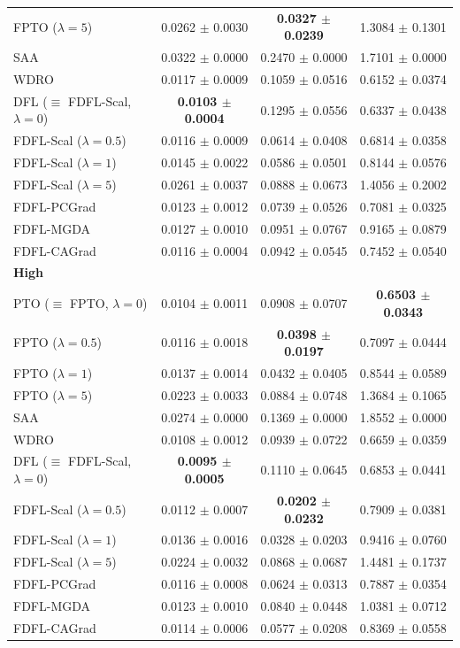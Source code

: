 \documentclass[ijoc,sglanonrev]{informs4}
\begin{document}
\begin{table}[htbp]
\begin{tabular}{lccc}
FPTO ($\lambda=5$) 
    & 0.0262 $\pm$ 0.0030 & \textbf{0.0327 $\pm$ 0.0239} & 1.3084 $\pm$ 0.1301 \\
SAA 
    & 0.0322 $\pm$ 0.0000 & 0.2470 $\pm$ 0.0000 & 1.7101 $\pm$ 0.0000 \\
WDRO 
    & 0.0117 $\pm$ 0.0009 & 0.1059 $\pm$ 0.0516 & 0.6152 $\pm$ 0.0374 \\
DFL ($\equiv$ FDFL-Scal, $\lambda=0$) 
    & \textbf{0.0103 $\pm$ 0.0004} & 0.1295 $\pm$ 0.0556 & 0.6337 $\pm$ 0.0438 \\
FDFL-Scal ($\lambda=0.5$) 
    & 0.0116 $\pm$ 0.0009 & 0.0614 $\pm$ 0.0408 & 0.6814 $\pm$ 0.0358 \\
FDFL-Scal ($\lambda=1$) 
    & 0.0145 $\pm$ 0.0022 & 0.0586 $\pm$ 0.0501 & 0.8144 $\pm$ 0.0576 \\
FDFL-Scal ($\lambda=5$) 
    & 0.0261 $\pm$ 0.0037 & 0.0888 $\pm$ 0.0673 & 1.4056 $\pm$ 0.2002 \\
FDFL-PCGrad 
    & 0.0123 $\pm$ 0.0012 & 0.0739 $\pm$ 0.0526 & 0.7081 $\pm$ 0.0325 \\
FDFL-MGDA 
    & 0.0127 $\pm$ 0.0010 & 0.0951 $\pm$ 0.0767 & 0.9165 $\pm$ 0.0879 \\
FDFL-CAGrad 
    & 0.0116 $\pm$ 0.0004 & 0.0942 $\pm$ 0.0545 & 0.7452 $\pm$ 0.0540 \\
\midrule
\multicolumn{4}{l}{\textbf{High}} \\
PTO ($\equiv$ FPTO, $\lambda=0$) 
    & 0.0104 $\pm$ 0.0011 & 0.0908 $\pm$ 0.0707 & \textbf{0.6503 $\pm$ 0.0343} \\
FPTO ($\lambda=0.5$) 
    & 0.0116 $\pm$ 0.0018 & \textbf{0.0398 $\pm$ 0.0197} & 0.7097 $\pm$ 0.0444 \\
FPTO ($\lambda=1$) 
    & 0.0137 $\pm$ 0.0014 & 0.0432 $\pm$ 0.0405 & 0.8544 $\pm$ 0.0589 \\
FPTO ($\lambda=5$) 
    & 0.0223 $\pm$ 0.0033 & 0.0884 $\pm$ 0.0748 & 1.3684 $\pm$ 0.1065 \\
SAA 
    & 0.0274 $\pm$ 0.0000 & 0.1369 $\pm$ 0.0000 & 1.8552 $\pm$ 0.0000 \\
WDRO 
    & 0.0108 $\pm$ 0.0012 & 0.0939 $\pm$ 0.0722 & 0.6659 $\pm$ 0.0359 \\
DFL ($\equiv$ FDFL-Scal, $\lambda=0$) 
    & \textbf{0.0095 $\pm$ 0.0005} & 0.1110 $\pm$ 0.0645 & 0.6853 $\pm$ 0.0441 \\
FDFL-Scal ($\lambda=0.5$) 
    & 0.0112 $\pm$ 0.0007 & \textbf{0.0202 $\pm$ 0.0232} & 0.7909 $\pm$ 0.0381 \\
FDFL-Scal ($\lambda=1$) 
    & 0.0136 $\pm$ 0.0016 & 0.0328 $\pm$ 0.0203 & 0.9416 $\pm$ 0.0760 \\
FDFL-Scal ($\lambda=5$) 
    & 0.0224 $\pm$ 0.0032 & 0.0868 $\pm$ 0.0687 & 1.4481 $\pm$ 0.1737 \\
FDFL-PCGrad 
    & 0.0116 $\pm$ 0.0008 & 0.0624 $\pm$ 0.0313 & 0.7887 $\pm$ 0.0354 \\
FDFL-MGDA 
    & 0.0123 $\pm$ 0.0010 & 0.0840 $\pm$ 0.0448 & 1.0381 $\pm$ 0.0712 \\
FDFL-CAGrad 
    & 0.0114 $\pm$ 0.0006 & 0.0577 $\pm$ 0.0208 & 0.8369 $\pm$ 0.0558 \\
\bottomrule
\end{tabular}
\end{table}
\end{document}
